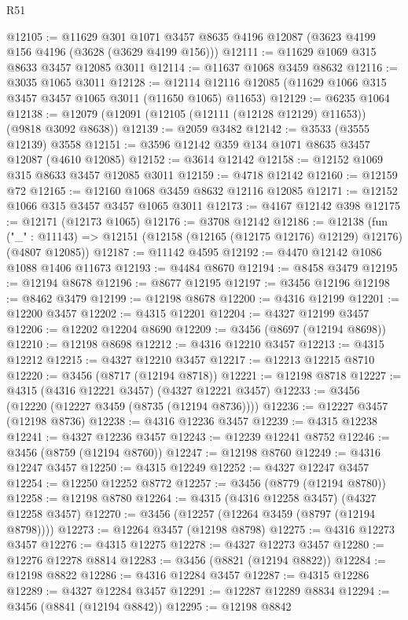 \begin{lexlean}{R51}
\begin{coremodule}
@12105 := @11629
    @301
    @1071
    @3457
    @8635
    @4196
    @12087
    (@3623 @4199 @156 @4196 (@3628 (@3629 @4199 @156)))
@12111 := @11629 @1069 @315 @8633 @3457 @12085 @3011
@12114 := @11637 @1068 @3459 @8632
@12116 := @3035 @1065 @3011
@12128 := @12114 @12116 @12085 (@11629 @1066 @315 @3457 @3457 @1065 @3011 (@11650 @1065) @11653)
@12129 := @6235 @1064
@12138 := @12079 (@12091 (@12105 (@12111 (@12128 @12129) @11653)) (@9818 @3092 @8638))
@12139 := @2059 @3482
@12142 := @3533 (@3555 @12139) @3558
@12151 := @3596 @12142 @359 @134 @1071 @8635 @3457 @12087 (@4610 @12085)
@12152 := @3614 @12142
@12158 := @12152 @1069 @315 @8633 @3457 @12085 @3011
@12159 := @4718 @12142
@12160 := @12159 @72
@12165 := @12160 @1068 @3459 @8632 @12116 @12085
@12171 := @12152 @1066 @315 @3457 @3457 @1065 @3011
@12173 := @4167 @12142 @398
@12175 := @12171 (@12173 @1065)
@12176 := @3708 @12142
@12186 := @12138
    (fun ("_" : @11143) => @12151 (@12158 (@12165 (@12175 @12176) @12129) @12176) (@4807 @12085))
@12187 := @11142 @4595
@12192 := @4470 @12142 @1086 @1088 @1406 @11673
@12193 := @4484 @8670
@12194 := @8458 @3479
@12195 := @12194 @8678
@12196 := @8677 @12195
@12197 := @3456 @12196
@12198 := @8462 @3479
@12199 := @12198 @8678
@12200 := @4316 @12199
@12201 := @12200 @3457
@12202 := @4315 @12201
@12204 := @4327 @12199 @3457
@12206 := @12202 @12204 @8690
@12209 := @3456 (@8697 (@12194 @8698))
@12210 := @12198 @8698
@12212 := @4316 @12210 @3457
@12213 := @4315 @12212
@12215 := @4327 @12210 @3457
@12217 := @12213 @12215 @8710
@12220 := @3456 (@8717 (@12194 @8718))
@12221 := @12198 @8718
@12227 := @4315 (@4316 @12221 @3457) (@4327 @12221 @3457)
@12233 := @3456 (@12220 (@12227 @3459 (@8735 (@12194 @8736))))
@12236 := @12227 @3457 (@12198 @8736)
@12238 := @4316 @12236 @3457
@12239 := @4315 @12238
@12241 := @4327 @12236 @3457
@12243 := @12239 @12241 @8752
@12246 := @3456 (@8759 (@12194 @8760))
@12247 := @12198 @8760
@12249 := @4316 @12247 @3457
@12250 := @4315 @12249
@12252 := @4327 @12247 @3457
@12254 := @12250 @12252 @8772
@12257 := @3456 (@8779 (@12194 @8780))
@12258 := @12198 @8780
@12264 := @4315 (@4316 @12258 @3457) (@4327 @12258 @3457)
@12270 := @3456 (@12257 (@12264 @3459 (@8797 (@12194 @8798))))
@12273 := @12264 @3457 (@12198 @8798)
@12275 := @4316 @12273 @3457
@12276 := @4315 @12275
@12278 := @4327 @12273 @3457
@12280 := @12276 @12278 @8814
@12283 := @3456 (@8821 (@12194 @8822))
@12284 := @12198 @8822
@12286 := @4316 @12284 @3457
@12287 := @4315 @12286
@12289 := @4327 @12284 @3457
@12291 := @12287 @12289 @8834
@12294 := @3456 (@8841 (@12194 @8842))
@12295 := @12198 @8842

\end{coremodule}
\end{lexlean}
